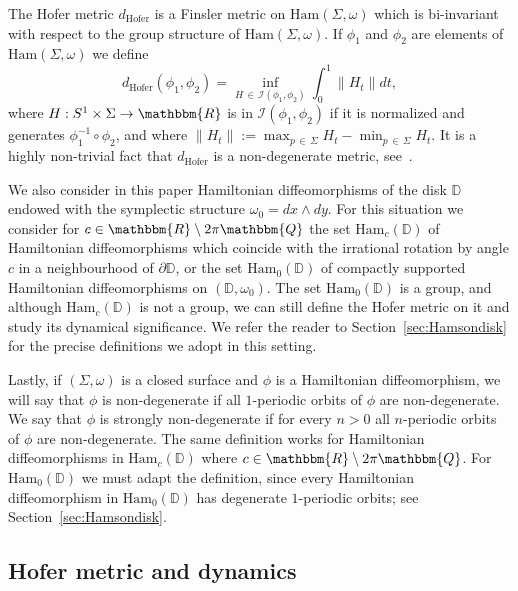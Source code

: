 \documentclass[AHL,Unicode,longabstracts,published]{cedram}
\newcommand{\Q}{\mathbbm{Q}}
\newcommand{\R}{\mathbbm{R}}
\newcommand{\D}{\mathbb{D}}
\newcommand{\Ham}{\mathrm{Ham}}
\newcommand{\hofer}{\mathrm{Hofer}}
\newcommand{\clI}{\mathcal{I}}
\newcommand{\hofer}{\mathrm{Hofer}}
\begin{document}
The Hofer metric $d_{\hofer}$ is a Finsler metric on $\Ham(\Sigma,\omega)$ which is bi-invariant with respect to the group structure of $\Ham(\Sigma,\omega)$. If $\phi_1$ and $\phi_2$ are elements of $\Ham(\Sigma,\omega)$ we define
\begin{equation}
d_{\hofer}(\phi_1,\phi_2) = \inf_{H\,\in\,\clI(\phi_1, \phi_2)} \int_{0}^1 \| H_t \|dt,
\end{equation}
where $H:S^1 \times \Sigma \to \R$ is in $ \clI(\phi_1, \phi_2)$ if it is normalized and generates $\phi_1^{-1}\circ \phi_2$, and where $\| H_t \|:= \max_{p\,\in\,\Sigma} H_t - \min_{p\,\in\,\Sigma} H_t$. It is a highly non-trivial fact that $d_{\hofer}$ is a non-degenerate metric, see~\cite{Hofer1990}.

We also consider in this paper Hamiltonian diffeomorphisms of the disk $\D$ endowed with the symplectic structure $\omega_0 = dx\wedge dy$. For this situation we consider for $c\in \R \setminus 2\pi \Q$ the set $\Ham_c(\D)$ of Hamiltonian diffeomorphisms which coincide with the irrational rotation by angle $c$ in a neighbourhood of $\partial \D$, or the set $\Ham_0(\D)$ of compactly supported Hamiltonian diffeomorphisms on $(\D,\omega_0)$. The set $\Ham_0(\D)$ is a group, and although $\Ham_c(\D)$ is not a group, we can still define the Hofer metric on it and study its dynamical significance. We refer the reader to Section~\ref{sec:Hamsondisk} for the precise definitions we adopt in this setting.

Lastly, if $(\Sigma,\omega)$ is a closed surface and $\phi$ is a Hamiltonian diffeomorphism, we will say that $\phi$ is non-degenerate if all $1$-periodic orbits of $\phi$ are non-degenerate. We say that $\phi$ is strongly non-degenerate if for every $n>0$ all $n$-periodic orbits of $\phi$ are non-degenerate. The same definition works for Hamiltonian diffeomorphisms in $\Ham_c(\D)$ where $c\in \R \setminus 2\pi \Q$. For $\Ham_0(\D)$ we must adapt the definition, since every Hamiltonian diffeomorphism in $\Ham_0(\D)$ has degenerate $1$-periodic orbits; see Section~\ref{sec:Hamsondisk}.



\subsection{Hofer metric and dynamics}
\end{document}

